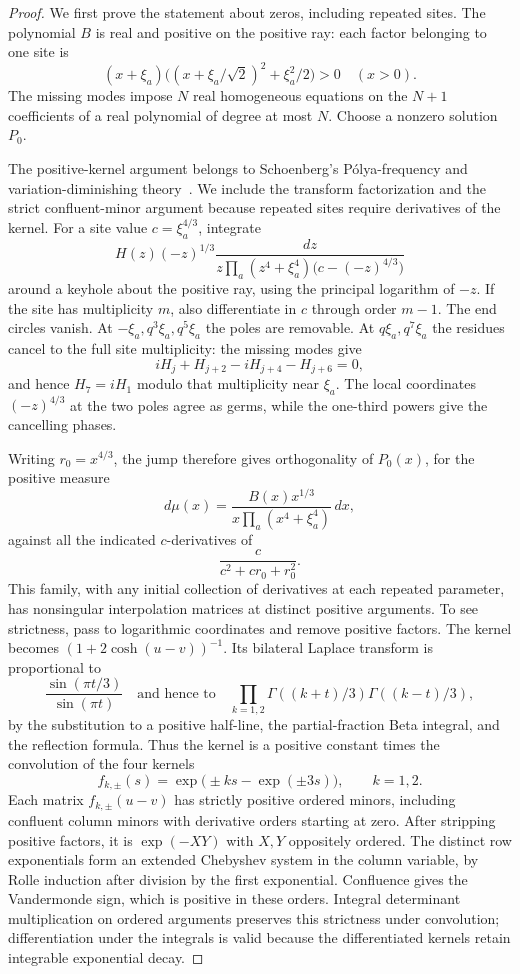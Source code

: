 \begin{proof}
We first prove the statement about zeros, including repeated sites. The polynomial \(B\) is real and positive on the positive ray: each factor belonging to one site is
\[
 (x+\xi_a)\bigl((x+\xi_a/\sqrt2)^2+\xi_a^2/2\bigr)>0
 \quad (x>0).
\]
The missing modes impose \(N\) real homogeneous equations on the \(N+1\) coefficients of a real polynomial of degree at most \(N\). Choose a nonzero solution \(P_0\).

The positive-kernel argument belongs to Schoenberg's P\'olya-frequency and variation-diminishing theory~\cite{Schoenberg1950PFII}. We include the transform factorization and the strict confluent-minor argument because repeated sites require derivatives of the kernel. For a site value \(c=\xi_a^{4/3}\), integrate
\[
 H(z)(-z)^{1/3}
 \frac{dz}{z\prod_a(z^4+\xi_a^4)\bigl(c-(-z)^{4/3}\bigr)}
\]
around a keyhole about the positive ray, using the principal logarithm of \(-z\). If the site has multiplicity \(m\), also differentiate in \(c\) through order \(m-1\). The end circles vanish. At \(-\xi_a,q^3\xi_a,q^5\xi_a\) the poles are removable. At \(q\xi_a,q^7\xi_a\) the residues cancel to the full site multiplicity: the missing modes give
\[
 iH_j+H_{j+2}-iH_{j+4}-H_{j+6}=0,
\]
and hence \(H_7=iH_1\) modulo that multiplicity near \(\xi_a\). The local coordinates \((-z)^{4/3}\) at the two poles agree as germs, while the one-third powers give the cancelling phases.

Writing \(r_0=x^{4/3}\), the jump therefore gives orthogonality of \(P_0(x)\), for the positive measure
\[
 d\mu(x)=\frac{B(x)x^{1/3}}{x\prod_a(x^4+\xi_a^4)}\,dx ,
\]
against all the indicated \(c\)-derivatives of
\[
 \frac{c}{c^2+c r_0+r_0^2}.
\]
This family, with any initial collection of derivatives at each repeated parameter, has nonsingular interpolation matrices at distinct positive arguments. To see strictness, pass to logarithmic coordinates and remove positive factors. The kernel becomes \((1+2\cosh(u-v))^{-1}\). Its bilateral Laplace transform is proportional to
\[
 \frac{\sin(\pi t/3)}{\sin(\pi t)}
 \quad\text{and hence to}\quad
 \prod_{k=1,2}\Gamma((k+t)/3)\Gamma((k-t)/3),
\]
by the substitution to a positive half-line, the partial-fraction Beta integral, and the reflection formula. Thus the kernel is a positive constant times the convolution of the four kernels
\[
 f_{k,\pm}(s)=\exp\bigl(\pm ks-\exp(\pm3s)\bigr),\qquad k=1,2.
\]
Each matrix \(f_{k,\pm}(u-v)\) has strictly positive ordered minors, including confluent column minors with derivative orders starting at zero. After stripping positive factors, it is \(\exp(-XY)\) with \(X,Y\) oppositely ordered. The distinct row exponentials form an extended Chebyshev system in the column variable, by Rolle induction after division by the first exponential. Confluence gives the Vandermonde sign, which is positive in these orders. Integral determinant multiplication on ordered arguments preserves this strictness under convolution; differentiation under the integrals is valid because the differentiated kernels retain integrable exponential decay.


\end{proof}
